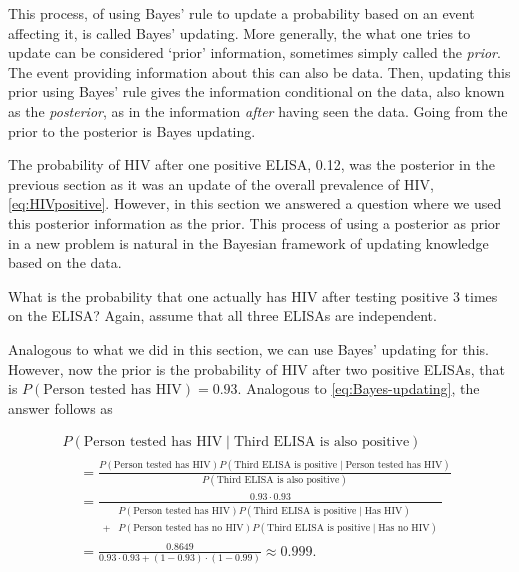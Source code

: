 \documentclass[]{book}
\theoremstyle{definition}
\theoremstyle{definition}
\theoremstyle{remark}
\let\BeginKnitrBlock\begin \let\EndKnitrBlock\end
\begin{document}
This process, of using Bayes' rule to update a probability based on an
event affecting it, is called Bayes' updating. More generally, the what
one tries to update can be considered `prior' information, sometimes
simply called the \emph{prior}. The event providing information about
this can also be data. Then, updating this prior using Bayes' rule gives
the information conditional on the data, also known as the
\emph{posterior}, as in the information \emph{after} having seen the
data. Going from the prior to the posterior is Bayes updating.

The probability of HIV after one positive ELISA, 0.12, was the posterior
in the previous section as it was an update of the overall prevalence of
HIV, \eqref{eq:HIVpositive}. However, in this section we answered a
question where we used this posterior information as the prior. This
process of using a posterior as prior in a new problem is natural in the
Bayesian framework of updating knowledge based on the data.

\BeginKnitrBlock{example}
\protect\hypertarget{ex:unnamed-chunk-6}{}{\label{ex:unnamed-chunk-6}}What
is the probability that one actually has HIV after testing positive 3
times on the ELISA? Again, assume that all three ELISAs are independent.
\EndKnitrBlock{example}

Analogous to what we did in this section, we can use Bayes' updating for
this. However, now the prior is the probability of HIV after two
positive ELISAs, that is \(P(\text{Person tested has HIV}) = 0.93\).
Analogous to \eqref{eq:Bayes-updating}, the answer follows as

\begin{multline*}
  P(\text{Person tested has HIV} \mid \text{Third ELISA is also positive}) \\
  \begin{split}
  &= \frac{P(\text{Person tested has HIV}) P(\text{Third ELISA is positive} \mid \text{Person tested has HIV})}{P(\text{Third ELISA is also positive})} \\
  &= \frac{0.93 \cdot 0.93}{\begin{split}
  &P(\text{Person tested has HIV}) P(\text{Third ELISA is positive} \mid \text{Has HIV}) \\
  + &P(\text{Person tested has no HIV}) P(\text{Third ELISA is positive} \mid \text{Has no HIV})
  \end{split}} \\
  &= \frac{0.8649}{0.93 \cdot 0.93 + (1 - 0.93)\cdot (1 - 0.99)} \approx 0.999.
  \end{split}
\end{multline*}
\end{document}
